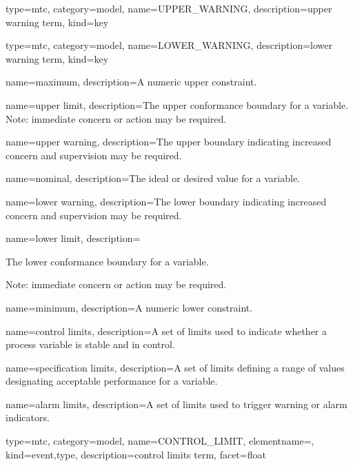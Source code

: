 {
  type=mtc,
  category=model,
  name={UPPER\_WARNING},
  description={\glsdesc{upper warning term}},
  kind={key}
}

{
  type=mtc,
  category=model,
  name={LOWER\_WARNING},
  description={\glsdesc{lower warning term}},
  kind={key}
}

{
  name={maximum},
  description={A numeric upper constraint.}
}

{
  name={upper limit},
  description={The upper conformance boundary for a variable.
  \newline Note: immediate concern or action may be required.}
}

{
  name={upper warning},
  description={The upper boundary indicating increased concern and supervision may be required.}
}

{
  name={nominal},
  description={The ideal or desired value for a variable.}
}

{
  name={lower warning},
  description={The lower boundary indicating increased concern and supervision may be required.}
}

{
  name={lower limit},
  description={The lower conformance boundary for a variable.
  \newline \begin{note}
  Note: immediate concern or action may be required.
  \end{note}}
}

{
  name={minimum},
  description={A numeric lower constraint.}
}

{
  name={control limits},
  description={A set of limits used to indicate whether a process variable is stable and in control.}
}

{
  name={specification limits},
  description={A set of limits defining a range of values designating acceptable performance for a variable.}
}

{
  name={alarm limits},
  description={A set of limits used to trigger warning or alarm indicators.}
}

{
  type=mtc,
  category=model,
  name={CONTROL\_LIMIT},
  elementname=,
  kind={event,type},
  description={\glsdesc{control limits term}},
  facet={\gls{float}}
}

